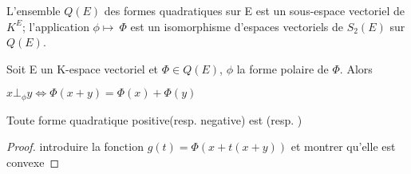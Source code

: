 	\begin{prop}
		L'ensemble $Q(E)$ des formes quadratiques sur E est un
		sous-espace vectoriel de $K^E$; l'application
		$\phi\mapsto~\Phi$ est un isomorphisme d'espaces vectoriels
		de $S_2(E)$ sur $Q(E)$.
	\end{prop}
	\begin{thm}[Pythagore]
		Soit E un K-espace vectoriel et $\Phi \in Q(E)$, $\phi$
		la forme polaire de $\Phi$. Alors

		$x \bot_{\phi} y \Leftrightarrow \Phi(x + y) = \Phi(x) + \Phi(y)$
	\end{thm}
	\begin{prop}[Convexite]
		Toute forme quadratique positive(resp. negative) est (resp. )
	\end{prop}

	\begin{proof}
		introduire la fonction $g(t) = \Phi(x + t(x+y))$ et montrer qu'elle est convexe
	\end{proof}

